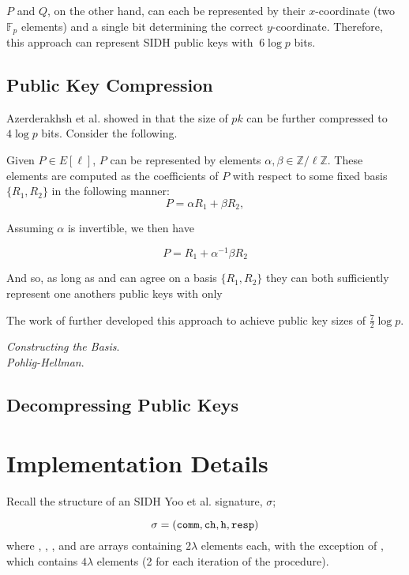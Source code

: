 $P$ and $Q$, on the other hand, can each be represented by their $x$-coordinate (two $\mathbb{F}_{p}$ elements) and a single bit determining the correct $y$-coordinate. Therefore, this approach can represent SIDH public keys with $~6\log p$ bits.

\subsection{Public Key Compression}

Azerderakhsh et al. showed in \cite{compwr} that the size of $pk$ can be further compressed to $4\log p$ bits. Consider the following.

Given $P \in E[\ell]$, $P$ can be represented by elements $\alpha, \beta \in \mathbb{Z}/\ell\mathbb{Z}$. These elements are computed as the coefficients of $P$ with respect to some fixed basis $\{R_1, R_2\}$ in the following manner: 
$$
P = \alpha R_1 + \beta R_2,
$$

Assuming $\alpha$ is invertible, we then have

$$
P = R_1 + \alpha^{-1}\beta R_2
$$

And so, as long as \alice and \bob can agree on a basis $\{R_1, R_2\}$ they can both sufficiently represent one anothers public keys with only 

The work of \cite{pkcomp} further developed this approach to achieve public key sizes of $\frac{7}{2}\log p$. 

\noindent
\textit{Constructing the Basis}.\\


\noindent
\textit{Pohlig-Hellman}. 

\subsection{Decompressing Public Keys}


\section{Implementation Details}
\label{sec:compimplementation}

Recall the structure of an SIDH Yoo et al. signature, $\sigma$;

$$
\sigma = (\texttt{comm}, \texttt{ch}, \texttt{h}, \texttt{resp})
$$
where , , , and  are arrays containing $2\lambda$ elements each, with the exception of , which contains $4\lambda$ elements (2 for each iteration of the procedure).


